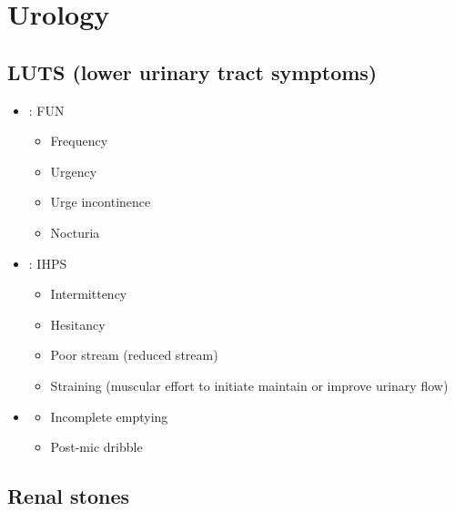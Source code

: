 \documentclass[
  14pt,
]{extarticle}
\providecommand{\tightlist}{%
  \setlength{\itemsep}{0pt}\setlength{\parskip}{0pt}}
\begin{document}
\pagebreak

\hypertarget{urology}{%
\section{Urology}\label{urology}}

\hypertarget{luts-lower-urinary-tract-symptoms}{%
\subsection{LUTS (lower urinary tract
symptoms)}\label{luts-lower-urinary-tract-symptoms}}

\begin{itemize}
\tightlist
\item
  \textbf{}: FUN

  \begin{itemize}
  \tightlist
  \item
    Frequency
  \item
    Urgency
  \item
    Urge incontinence
  \item
    Nocturia
  \end{itemize}
\item
  \textbf{}: IHPS

  \begin{itemize}
  \tightlist
  \item
    Intermittency
  \item
    Hesitancy
  \item
    Poor stream (reduced stream)
  \item
    Straining (muscular effort to initiate maintain or improve urinary
    flow)
  \end{itemize}
\item
  \textbf{}

  \begin{itemize}
  \tightlist
  \item
    Incomplete emptying
  \item
    Post-mic dribble
  \end{itemize}
\end{itemize}

\pagebreak

\hypertarget{renal-stones}{%
\subsection{Renal stones}\label{renal-stones}}
\end{document}

